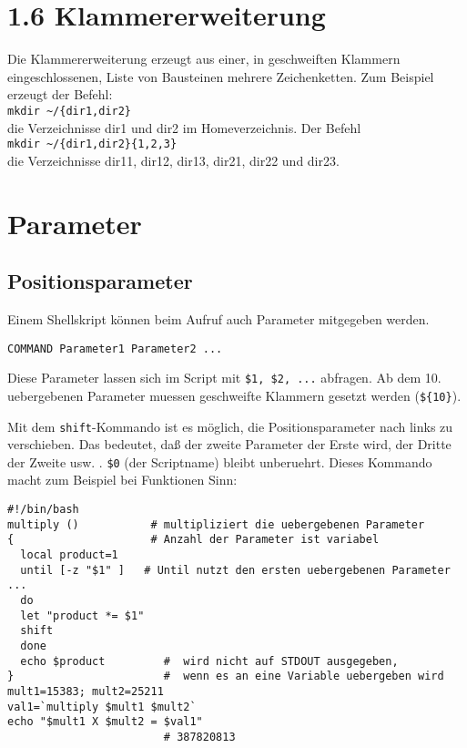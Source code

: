 \documentclass[12pt,]{article}
\begin{document}
\section{1.6 Klammererweiterung}\label{klammererweiterung}

Die Klammererweiterung erzeugt aus einer, in geschweiften Klammern
eingeschlossenen, Liste von Bausteinen mehrere Zeichenketten. Zum
Beispiel erzeugt der Befehl:\\
\texttt{mkdir\ \textasciitilde{}/\{dir1,dir2\}}\\
die Verzeichnisse dir1 und dir2 im Homeverzeichnis. Der Befehl\\
\texttt{mkdir\ \textasciitilde{}/\{dir1,dir2\}\{1,2,3\}}\\
die Verzeichnisse dir11, dir12, dir13, dir21, dir22 und dir23.

\section{Parameter}\label{parameter}

\subsection{Positionsparameter}\label{positionsparameter}

Einem Shellskript können beim Aufruf auch Parameter mitgegeben werden.

\begin{verbatim}
COMMAND Parameter1 Parameter2 ...
\end{verbatim}

Diese Parameter lassen sich im Script mit \texttt{\$1,\ \$2,\ ...}
abfragen. Ab dem 10. uebergebenen Parameter muessen geschweifte Klammern
gesetzt werden (\texttt{\$\{10\}}).

Mit dem \texttt{shift}-Kommando ist es möglich, die Positionsparameter
nach links zu verschieben. Das bedeutet, daß der zweite Parameter der
Erste wird, der Dritte der Zweite usw. . \texttt{\$0} (der Scriptname)
bleibt unberuehrt. Dieses Kommando macht zum Beispiel bei Funktionen
Sinn:

\begin{verbatim}
#!/bin/bash
multiply ()           # multipliziert die uebergebenen Parameter
{                     # Anzahl der Parameter ist variabel
  local product=1
  until [-z "$1" ]   # Until nutzt den ersten uebergebenen Parameter ...
  do
  let "product *= $1"
  shift
  done
  echo $product         #  wird nicht auf STDOUT ausgegeben,
}                       #  wenn es an eine Variable uebergeben wird
mult1=15383; mult2=25211
val1=`multiply $mult1 $mult2`
echo "$mult1 X $mult2 = $val1"
                        # 387820813
\end{verbatim}
\end{document}
